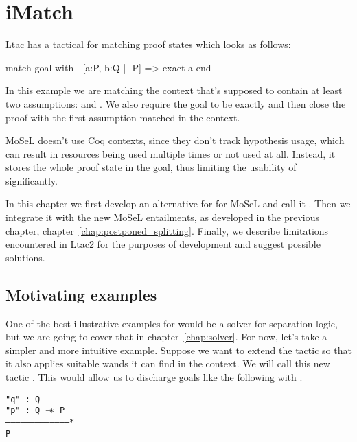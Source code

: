 \chapter{iMatch}
\label{chap:imatch}

Ltac has a tactical for matching proof states which looks as follows:

\begin{coq}
match goal with
| [a:P, b:Q |- P] => exact a
end
\end{coq}

In this example we are matching the context that's supposed to contain at least two assumptions:  and .
We also require the goal to be exactly  and then close the proof with the first assumption matched in the context.

MoSeL doesn't use Coq contexts, since they don't track hypothesis usage, which can result in resources being used multiple times or not used at all.
Instead, it stores the whole proof state in the goal, thus limiting the usability of  significantly.

In this chapter we first develop an alternative for  for MoSeL and call it .
Then we integrate it with the new MoSeL entailments, as developed in the previous chapter, chapter~\ref{chap:postponed_splitting}.
Finally, we describe limitations encountered in Ltac2 for the purposes of development and suggest possible solutions.

\section{Motivating examples}

One of the best illustrative examples for  would be a solver for separation logic, but we are going to cover that in chapter~\ref{chap:solver}.
For now, let's take a simpler and more intuitive example.
Suppose we want to extend the  tactic so that it also applies suitable wands it can find in the context.
We will call this new tactic .
This would allow us to discharge goals like the following with .

\begin{minipage}{\linewidth}
\texttt{"q" : Q\\
"p" : Q $\mathrel{-\mkern-6mu*}$ P\\
---------------------------------------*\\
P
}
\end{minipage}


